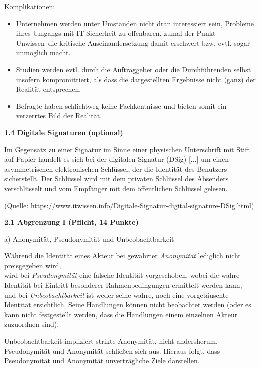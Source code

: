 \documentclass[ngerman]{fbi-aufgabenblatt}
\begin{document}
Komplikationen: 
\begin{itemize}
\item Unternehmen werden unter Umständen nicht dran interessiert sein,
Probleme ihres Umgangs mit IT-Sicherheit zu offenbaren, zumal der Punkt \dq Unwissen\dq \ die kritische Auseinandersetzung damit erschwert bzw. evtl. sogar unmöglich macht.
\item Studien werden evtl. durch die Auftraggeber oder die Durchführenden selbst insofern kompromittiert, als dass die dargestellten Ergebnisse nicht (ganz) der Realität entsprechen.
\item Befragte haben schlichtweg keine Fachkentnisse und bieten somit ein verzerrtes Bild der Realität.
\end{itemize}

\textbf{1.4 Digitale Signaturen (optional)}

Im Gegensatz zu einer Signatur im Sinne einer physischen Unterschrift mit Stift auf Papier handelt es sich
\dq bei der digitalen Signatur (DSig) [...] um einen asymmetrischen elektronischen Schlüssel, 
der die Identität des Benutzers sicherstellt. Der Schlüssel wird mit dem privaten Schlüssel des Absenders verschlüsselt 
und vom Empfänger mit dem öffentlichen Schlüssel gelesen.\dq

(Quelle: \url{https://www.itwissen.info/Digitale-Signatur-digital-signature-DSig.html})


%
%

\textbf{2.1 Abgrenzung I (Pflicht, 14 Punkte)}

a) Anonymität, Pseudonymität und Unbeobachtbarkeit

Während die Identität eines Akteur bei gewahrter \emph{Anonymität} lediglich nicht preisgegeben wird,\\
wird bei \emph{Pseudonymität} eine falsche Identität vorgeschoben, wobei die wahre Identität bei Eintritt besonderer Rahmenbedingungen ermittelt werden kann,\\
und bei \emph{Unbeobachtbarkeit} ist weder seine wahre, noch eine vorgetäuschte Identität ersichtlich. Seine Handlungen können nicht beobachtet werden (oder es kann nicht festgestellt werden, dass die Handlungen einem einzelnen Akteur zuzuordnen sind).

Unbeobachtbarkeit impliziert strikte Anonymität, nicht andersherum. 
Pseudonymität und Anonymität schließen sich aus.
Hieraus folgt, dass Pseudonymität und Anonymität unverträgliche Ziele darstellen.    
\end{document}
